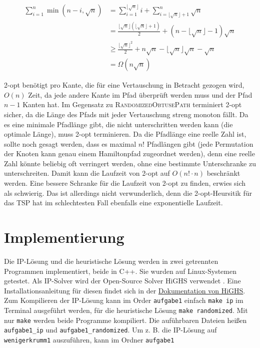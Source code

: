 \documentclass[a4paper, 10pt, ngerman]{article}
\begin{document}
\begin{align*}
    \sum_{i = 1}^{n} \min(n - i, \sqrt n) & = 
    \sum_{i = 1}^{\lfloor \sqrt n \rfloor} i +
    \sum_{i = \lfloor \sqrt n \rfloor + 1}^n \sqrt n \\
    & = \frac {\lfloor \sqrt n \rfloor (\lfloor \sqrt n \rfloor + 1)} 2 +
    (n - \lfloor \sqrt n \rfloor - 1) \sqrt n \\
    & \ge \frac {\lfloor \sqrt n \rfloor ^2} 2  + n \sqrt n - \lfloor \sqrt n \rfloor \sqrt n - \sqrt n \\
    & = \Omega(n \sqrt n)
\end{align*}

2-opt benötigt pro Kante, die für eine Vertauschung in Betracht gezogen wird, $O(n)$ Zeit, da jede andere Kante im Pfad überprüft werden muss und der Pfad $n - 1$ Kanten hat. Im Gegensatz zu \textsc{RandomizedObtusePath} terminiert 2-opt sicher, da die Länge des Pfads mit jeder Vertauschung streng monoton fällt. Da es eine minimale Pfadlänge gibt, die nicht unterschritten werden kann (die optimale Länge), muss 2-opt terminieren. Da die Pfadlänge eine reelle Zahl ist, sollte noch gesagt werden, dass es maximal $n!$ Pfadlängen gibt (jede Permutation der Knoten kann genau einem Hamiltonpfad zugeordnet werden), denn eine reelle Zahl könnte beliebig oft verringert werden, ohne eine bestimmte Unterschranke zu unterschreiten. Damit kann die Laufzeit von 2-opt auf $O(n! \cdot n)$ beschränkt werden. Eine bessere Schranke für die Laufzeit von 2-opt zu finden, erwies sich als schwierig. Das ist allerdings nicht verwunderlich, denn die 2-opt-Heursitik für das TSP hat im schlechtesten Fall ebenfalls eine exponentielle Laufzeit.

\section{Implementierung}

Die IP-Lösung und die heuristische Lösung werden in zwei getrennten Programmen implementiert, beide in C++. Sie wurden auf Linux-Systemen getestet. Als IP-Solver wird der Open-Source Solver HiGHS verwendet \cite{highs}. Eine Installationsanleitung für diesen findet sich in der \href{https://ergo-code.github.io/HiGHS/dev/}{Dokumentation von HiGHS}. Zum Kompilieren der IP-Lösung kann im Order \verb|aufgabe1| einfach \verb|make ip| im Terminal ausgeführt werden, für die heuristische Lösung \verb|make randomized|. Mit nur \verb|make| werden beide Programme kompiliert. Die auführbaren Dateien heißen \verb|aufgabe1_ip| und \verb|aufgabe1_randomized|. Um z. B. die IP-Lösung auf \verb|wenigerkrumm1| auszuführen, kann im Ordner \verb|aufgabe1|
\end{document}
